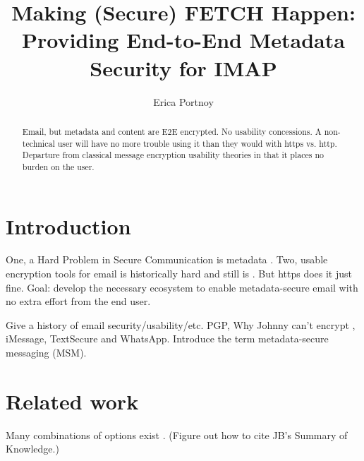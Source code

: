 \documentclass[pageno]{jpaper}
\newcommand{\project}{IMAPSec }
\begin{document}
\title{Making (Secure) FETCH Happen:
\\ \vspace{2 mm} {\large Providing End-to-End Metadata Security for IMAP}}


\author{Erica Portnoy}

\date{}
\maketitle

\thispagestyle{empty}

\tableofcontents

\begin{abstract}
Email, but metadata and content are E2E encrypted. No usability concessions. A non-technical user will have no more trouble using it than they would with https vs. http. Departure from classical message encryption usability theories in that it places no burden on the user.
\end{abstract}

\section{Introduction}

One, a Hard Problem in Secure Communication is metadata \cite{hardprob}. Two, usable encryption tools for email is historically hard and still is \cite{johnny}. But https does it just fine. Goal: develop the necessary ecosystem to enable metadata-secure email with no extra effort from the end user.

Give a history of email security/usability/etc. PGP, Why Johnny can't encrypt \cite{johnny}, iMessage, TextSecure and WhatsApp. Introduce the term metadata-secure messaging (MSM).

\section{Related work}
Many combinations of options exist \cite{spreadsheet}. (Figure out how to cite JB's Summary of Knowledge.)
\end{document}
